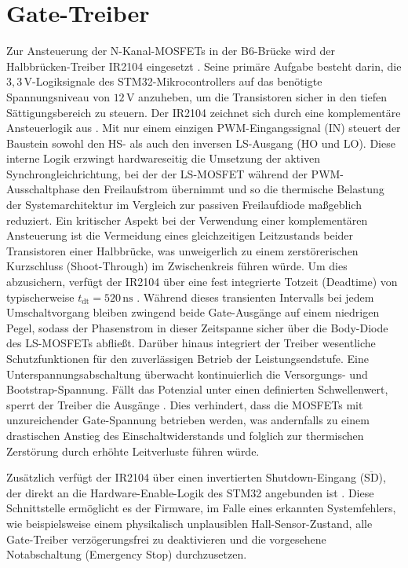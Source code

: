 \section{Gate-Treiber}
\label{sec:gate_treiber}

Zur Ansteuerung der N-Kanal-MOSFETs in der B6-Brücke wird der Halbbrücken-Treiber IR2104 eingesetzt \cite{DS_IR2104}. Seine primäre Aufgabe besteht darin, die $3{,}3\,\mathrm{V}$-Logiksignale des STM32-Mikrocontrollers auf das benötigte Spannungsniveau von $12\,\mathrm{V}$ anzuheben, um die Transistoren sicher in den tiefen Sättigungsbereich zu steuern. 
Der IR2104 zeichnet sich durch eine komplementäre Ansteuerlogik aus \cite{DS_IR2104}. Mit nur einem einzigen PWM-Eingangssignal (IN) steuert der Baustein sowohl den HS- als auch den inversen LS-Ausgang (HO und LO). Diese interne Logik erzwingt hardwareseitig die Umsetzung der aktiven Synchrongleichrichtung, bei der der LS-MOSFET während der PWM-Ausschaltphase den Freilaufstrom übernimmt und so die thermische Belastung der Systemarchitektur im Vergleich zur passiven Freilaufdiode maßgeblich reduziert.
Ein kritischer Aspekt bei der Verwendung einer komplementären Ansteuerung ist die Vermeidung eines gleichzeitigen Leitzustands beider Transistoren einer Halbbrücke, was unweigerlich zu einem zerstörerischen Kurzschluss (Shoot-Through) im Zwischenkreis führen würde. Um dies abzusichern, verfügt der IR2104 über eine fest integrierte Totzeit (Deadtime) von typischerweise $t_{\mathrm{dt}} = 520\,\mathrm{ns}$ \cite{DS_IR2104}. Während dieses transienten Intervalls bei jedem Umschaltvorgang bleiben zwingend beide Gate-Ausgänge auf einem niedrigen Pegel, sodass der Phasenstrom in dieser Zeitspanne sicher über die Body-Diode des LS-MOSFETs abfließt.
Darüber hinaus integriert der Treiber wesentliche Schutzfunktionen für den zuverlässigen Betrieb der Leistungsendstufe. Eine Unterspannungsabschaltung überwacht kontinuierlich die Versorgungs- und Bootstrap-Spannung. Fällt das Potenzial unter einen definierten Schwellenwert, sperrt der Treiber die Ausgänge \cite{DS_IR2104}. Dies verhindert, dass die MOSFETs mit unzureichender Gate-Spannung betrieben werden, was andernfalls zu einem drastischen Anstieg des Einschaltwiderstands und folglich zur thermischen Zerstörung durch erhöhte Leitverluste führen würde.

Zusätzlich verfügt der IR2104 über einen invertierten Shutdown-Eingang ($\overline{\mathrm{SD}}$), der direkt an die Hardware-Enable-Logik des STM32 angebunden ist \cite{DS_IR2104}. Diese Schnittstelle ermöglicht es der Firmware, im Falle eines erkannten Systemfehlers, wie beispielsweise einem physikalisch unplausiblen Hall-Sensor-Zustand, alle Gate-Treiber verzögerungsfrei zu deaktivieren und die vorgesehene Notabschaltung (Emergency Stop) durchzusetzen.

